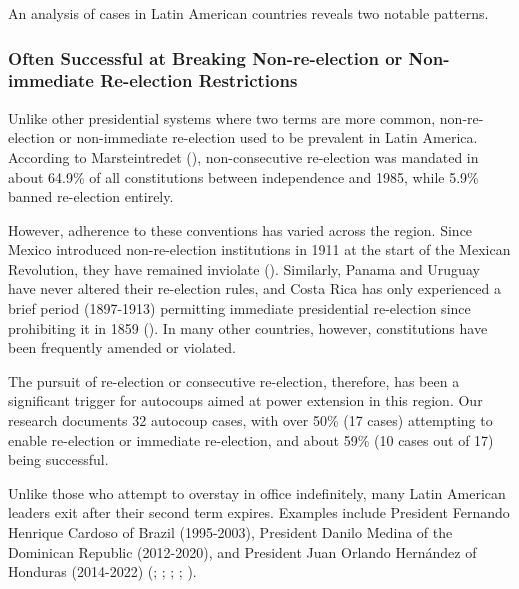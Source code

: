 \documentclass[
  12pt,
]{report}
\begin{document}
An analysis of cases in Latin American countries reveals two notable
patterns.

\subsubsection*{Often Successful at Breaking Non-re-election or
Non-immediate Re-election
Restrictions}\label{often-successful-at-breaking-non-re-election-or-non-immediate-re-election-restrictions}

Unlike other presidential systems where two terms are more common,
non-re-election or non-immediate re-election used to be prevalent in
Latin America. According to Marsteintredet
(), non-consecutive re-election
was mandated in about 64.9\% of all constitutions between independence
and 1985, while 5.9\% banned re-election entirely.

However, adherence to these conventions has varied across the region.
Since Mexico introduced non-re-election institutions in 1911 at the
start of the Mexican Revolution, they have remained inviolate
(). Similarly, Panama and
Uruguay have never altered their re-election rules, and Costa Rica has
only experienced a brief period (1897-1913) permitting immediate
presidential re-election since prohibiting it in 1859
(). In many other
countries, however, constitutions have been frequently amended or
violated.

The pursuit of re-election or consecutive re-election, therefore, has
been a significant trigger for autocoups aimed at power extension in
this region. Our research documents 32 autocoup cases, with over 50\%
(17 cases) attempting to enable re-election or immediate re-election,
and about 59\% (10 cases out of 17) being successful.

Unlike those who attempt to overstay in office indefinitely, many Latin
American leaders exit after their second term expires. Examples include
President Fernando Henrique Cardoso of Brazil (1995-2003), President
Danilo Medina of the Dominican Republic (2012-2020), and President Juan
Orlando Hernández of Honduras (2014-2022)
(;
;
;
; ).
\end{document}
